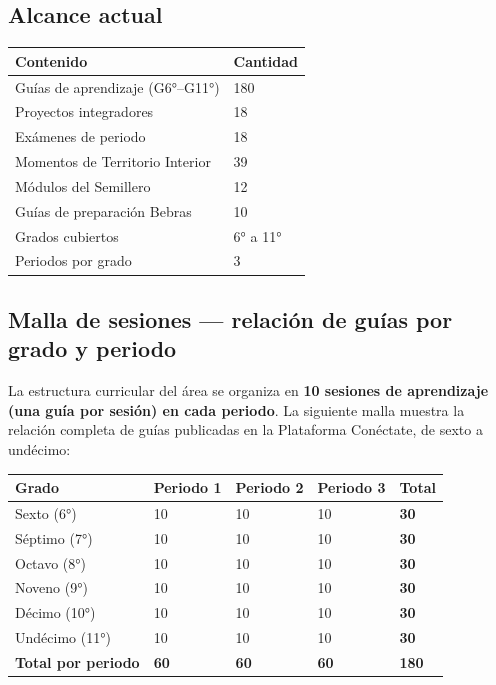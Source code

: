 \documentclass[12pt, a4paper]{article}
\renewcommand{\arraystretch}{1.4}
\begin{document}
\subsection{Alcance actual}

\begin{center}
\begin{tabular}{|L{7cm}|L{3cm}|}
\hline
{}
\color{white}\textbf{Contenido} & \color{white}\textbf{Cantidad} \\
\hline
Guías de aprendizaje (G6°–G11°) & 180 \\
\hline
Proyectos integradores & 18 \\
\hline
Exámenes de periodo & 18 \\
\hline
Momentos de Territorio Interior & 39 \\
\hline
Módulos del Semillero & 12 \\
\hline
Guías de preparación Bebras & 10 \\
\hline
Grados cubiertos & 6° a 11° \\
\hline
Periodos por grado & 3 \\
\hline
\end{tabular}
\end{center}

\subsection{Malla de sesiones — relación de guías por grado y periodo}

La estructura curricular del área se organiza en \textbf{10 sesiones de aprendizaje
(una guía por sesión) en cada periodo}. La siguiente malla muestra la relación
completa de guías publicadas en la Plataforma Conéctate, de sexto a undécimo:

\begin{center}
\setlength{\tabcolsep}{6pt}
\renewcommand{\arraystretch}{1.35}
\begin{tabular}{|L{3.5cm}|M{2.3cm}|M{2.3cm}|M{2.3cm}|M{2cm}|}
\hline
{}
\color{white}\textbf{Grado} &
\color{white}\textbf{Periodo 1} &
\color{white}\textbf{Periodo 2} &
\color{white}\textbf{Periodo 3} &
\color{white}\textbf{Total} \\
\hline
Sexto (6°) & 10 & 10 & 10 & \textbf{30} \\
\hline
Séptimo (7°) & 10 & 10 & 10 & \textbf{30} \\
\hline
Octavo (8°) & 10 & 10 & 10 & \textbf{30} \\
\hline
Noveno (9°) & 10 & 10 & 10 & \textbf{30} \\
\hline
Décimo (10°) & 10 & 10 & 10 & \textbf{30} \\
\hline
Undécimo (11°) & 10 & 10 & 10 & \textbf{30} \\
\hline
{}
\textbf{Total por periodo} & \textbf{60} & \textbf{60} & \textbf{60} & \textbf{180} \\
\hline
\end{tabular}
\end{center}
\end{document}
